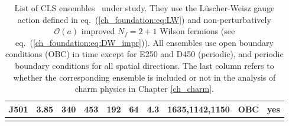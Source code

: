 \begin{longtable}{c c c c c c c c c c}
    J501 & 3.85 & 340 & 453 & 192 & 64 & 4.3 & 1635,1142,1150 & OBC & yes\\
    \bottomrule
    \caption{List of CLS ensembles~\citep{Bruno:2014jqa,Mohler:2017wnb} under study. They use the Lüscher-Weisz gauge action defined in eq.~(\ref{ch_foundation:eq:LW}) and non-perturbatively $\mathcal{O}(a)$ improved $N_f=2+1$ Wilson fermions (see eq.~(\ref{ch_foundation:eq:DW_impr})). All ensembles use open boundary conditions (OBC) in time except for E250 and D450 (periodic), and periodic boundary conditions for all spatial directions. The last column refers to whether the corresponding ensemble is included or not in the analysis of charm physics in Chapter \ref{ch_charm}.}
\end{longtable}


